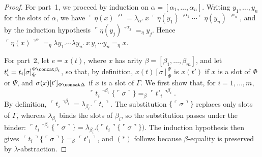 \begin{proof}
    For part~1, we proceed by induction on $\alpha = [\alpha_1, \ldots, \alpha_n]$. Writing $y_1, \ldots, y_n$ for the slots of $\alpha$, we have $\ulcorner \eta(x) \urcorner^\alpha = \lambda_\alpha.\, x\, \ulcorner \eta(y_1) \urcorner^{\alpha_1} \cdots \ulcorner \eta(y_n) \urcorner^{\alpha_n}$, and by the induction hypothesis $\ulcorner \eta(y_j) \urcorner^{\alpha_j} =_\eta y_j$. Hence $\ulcorner \eta(x) \urcorner^\alpha =_\eta \lambda y_1. \cdots \lambda y_n.\, x\, y_1 \cdots y_n =_\eta x$.

    For part~2, let $e = x(t)$, where $x$ has arity $\beta = [\beta_1, \ldots, \beta_m]$, and let $t'_i = t_i[\sigma]_\Phi^{\Psi \concat \beta_i}$, so that, by definition, $x(t)[\sigma]_\Phi^\Psi$ is $x(t')$ if $x$ is a slot of $\Phi$ or $\Psi$, and $\sigma(x)[t']_{\Phi \concat \Delta}$ if $x$ is a slot of $\Gamma$.
    We first show that, for $i = 1, \ldots, m$,
    \[
    \ulcorner t_i \urcorner^{\beta_i}\{\ulcorner \sigma \urcorner\} =_\beta \ulcorner t'_i \urcorner^{\beta_i}. \tag{$*$}
    \]
    By definition, $\ulcorner t_i \urcorner^{\beta_i} = \lambda_{\beta_i}. \ulcorner t_i \urcorner$. The substitution $\{\ulcorner \sigma \urcorner\}$ replaces only slots of $\Gamma$, whereas $\lambda_{\beta_i}$ binds the slots of $\beta_i$, so the substitution passes under the binder: $\ulcorner t_i \urcorner^{\beta_i}\{\ulcorner \sigma \urcorner\} = \lambda_{\beta_i}. \big(\ulcorner t_i \urcorner\{\ulcorner \sigma \urcorner\}\big)$. The induction hypothesis then gives $\ulcorner t_i \urcorner\{\ulcorner \sigma \urcorner\} =_\beta \ulcorner t'_i \urcorner$, and $(*)$ follows because $\beta$-equality is preserved by $\lambda$-abstraction.


\end{proof}
